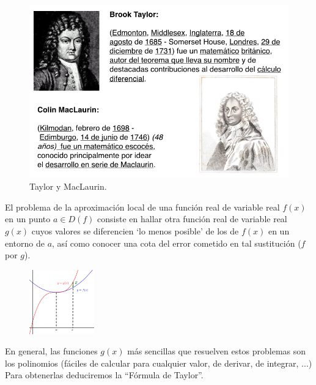 	\begin{figure}[]
		\centering
		\includegraphics[width=1\textwidth]{imagenes/imagenes06/T06IM01.png}
		\caption{Taylor y MacLaurin.}
	\end{figure}
	
	\begin{multicols}{2}
	El problema de la aproximación local de una función real de variable real $f(x)$ en un punto $a 	\in  D(f)$ consiste en hallar otra función real de variable real $g(x)$ cuyos valores se diferencien `lo menos posible' de los de $f(x)$ en un entorno de $a$, así como conocer una cota del error cometido en tal sustitución ($f$ por $g$).
	\begin{figure}[H]
		\centering
		\includegraphics[width=0.25\textwidth]{imagenes/imagenes06/T06IM02.png}
	\end{figure}
	\end{multicols}
	
	En general, las funciones $g(x)$ más sencillas que resuelven estos problemas son los polinomios \textcolor{gris}{(fáciles de calcular para cualquier valor, de derivar, de integrar, ...)} Para obtenerlas deduciremos la ``Fórmula de Taylor''.
	
